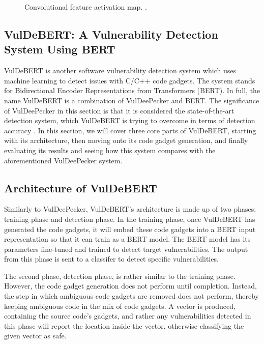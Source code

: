 \documentclass[12pt,twocolumn,letterpaper]{article}
\begin{document}
\begin{figure}[h]
    \centering
    \caption{Convolutional feature activation map. \cite{Russell18}.}
    \label{fig:af-3}
\end{figure}

\subsection{VulDeBERT: A Vulnerability Detection System Using BERT}
\label{sub:vuldebert}
VulDeBERT is another software vulnerability detection system which uses machine learning to detect issues with C/C++ code gadgets. The system stands for Bidirectional Encoder Representations from Transformers (BERT).
In full, the name VulDeBERT is a combination of VulDeePecker and BERT. The significance of VulDeePecker in this section is that it is considered the state-of-the-art detection system, which
VulDeBERT is trying to overcome in terms of detection accuracy \cite{Kim22}. In this section, we will cover three core parts of VulDeBERT, starting with its architecture,
then moving onto its code gadget generation, and finally evaluating its results and seeing how this system compares with the aforementioned VulDeePecker system.
\subsection{Architecture of VulDeBERT}
Similarly to VulDeePecker, VulDeBERT's architecture is made up of two phases; training phase and detection phase.
In the training phase, once VulDeBERT has generated the code gadgets, it will embed these code gadgets into a BERT input representation so that it can train
as a BERT model. The BERT model has its parameters fine-tuned and trained to detect target vulnerabilities. The output from this phase
is sent to a classifer to detect specific vulnerabilities.

The second phase, detection phase, is rather similar to the training phase. However, the code gadget generation does not perform until completion. Instead,
the step in which ambiguous code gadgets are removed does not perform, thereby keeping ambiguous code in the mix of code gadgets.
A vector is produced, containing the source code's gadgets, and rather any vulnerabilities detected in this phase will report the location inside
the vector, otherwise classifying the given vector as safe.
\end{document}
